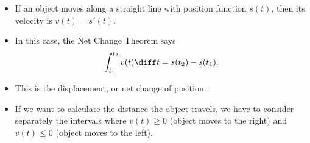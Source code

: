 \begin{frame}
\begin{itemize}
\item  If an object moves along a straight line with position function $s(t)$, then its velocity is $v(t) = s'(t)$.
\item  In this case, the Net Change Theorem says
\[
\int_{t_1}^{t_2} v(t) \diff t = s(t_2) - s(t_1).
\]
\item<2->  This is the displacement, or net change of position.
\item<3->  If we want to calculate the distance the object travels, we have to consider separately the intervals where $v(t) \geq 0$ (object moves to the right) and $v(t) \leq 0$ (object moves to the left).
\end{itemize}
\vspace{-.5cm}
\begin{columns}
%
\abovedisplayskip=0pt
\belowdisplayskip=0pt
\abovedisplayshortskip=0pt
\belowdisplayshortskip=0pt
%
\end{columns}
\end{frame}

